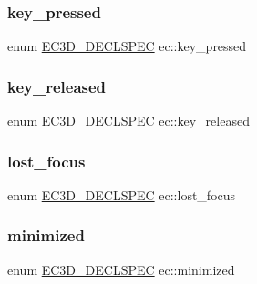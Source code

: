\mbox{\label{namespaceec_a6db9eda8a1039ccbbc883b1156c6c838}} 
\subsubsection{\texorpdfstring{key\+\_\+pressed}{key\_pressed}}
{\footnotesize\ttfamily enum \mbox{\hyperlink{_common_8h_aac42573e202ca3dd4d259c81691e2369}{E\+C3\+D\+\_\+\+D\+E\+C\+L\+S\+P\+EC}} ec\+::key\+\_\+pressed\hspace{0.3cm}{\ttfamily [strong]}}

\mbox{\label{namespaceec_a8ec308d52dd60f3bc270fc07a113bd67}} 
\subsubsection{\texorpdfstring{key\+\_\+released}{key\_released}}
{\footnotesize\ttfamily enum \mbox{\hyperlink{_common_8h_aac42573e202ca3dd4d259c81691e2369}{E\+C3\+D\+\_\+\+D\+E\+C\+L\+S\+P\+EC}} ec\+::key\+\_\+released\hspace{0.3cm}{\ttfamily [strong]}}

\mbox{\label{namespaceec_af038c649a7c43904c7d37ba129f1b346}} 
\subsubsection{\texorpdfstring{lost\+\_\+focus}{lost\_focus}}
{\footnotesize\ttfamily enum \mbox{\hyperlink{_common_8h_aac42573e202ca3dd4d259c81691e2369}{E\+C3\+D\+\_\+\+D\+E\+C\+L\+S\+P\+EC}} ec\+::lost\+\_\+focus\hspace{0.3cm}{\ttfamily [strong]}}

\mbox{\label{namespaceec_a5886b41b06c3a2522782c1129b38569d}} 
\subsubsection{\texorpdfstring{minimized}{minimized}}
{\footnotesize\ttfamily enum \mbox{\hyperlink{_common_8h_aac42573e202ca3dd4d259c81691e2369}{E\+C3\+D\+\_\+\+D\+E\+C\+L\+S\+P\+EC}} ec\+::minimized\hspace{0.3cm}{\ttfamily [strong]}}

